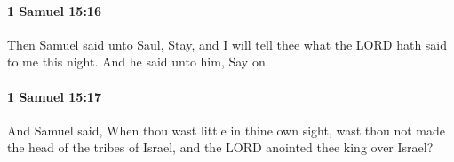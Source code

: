 		\paragraph{1 Samuel 15:16} %
			\label{1SAMUEL-15-16}

			Then Samuel said unto Saul, Stay, and I will tell thee what the LORD hath said to me this night. And he said unto him, Say on.


		\paragraph{1 Samuel 15:17} %
			\label{1SAMUEL-15-17}

			And Samuel said, When thou wast little in thine own sight, wast thou not made the head of the tribes of Israel, and the LORD anointed thee king over Israel?


